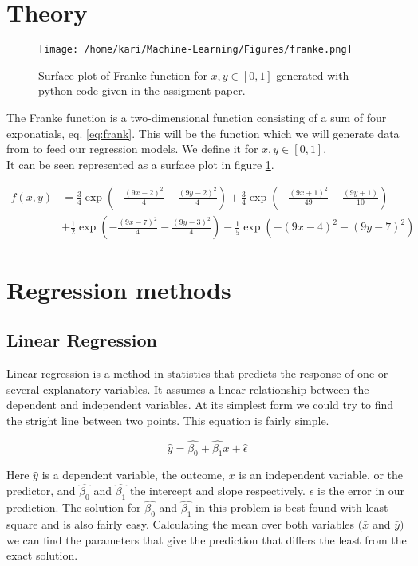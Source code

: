 \documentclass[a4paper,12pt, english]{article}
\begin{document}
\section*{Theory}

\begin{figure}
\centering
\texttt{[image: /home/kari/Machine-Learning/Figures/franke.png]}
\caption{Surface plot of Franke function for $x, y \in [0,1]$ generated with python code given in the assigment paper.}
\label{fig:franke}
\end{figure}


The Franke function is a two-dimensional function consisting of a sum of four exponatials, eq. \ref{eq:frank}. This will be the function which we will generate data from to feed our regression models. We define it for $x, y \in [0,1]$. \\
It can be seen represented as a surface plot in figure \ref{fig:franke}.

\begin{align}
f(x,y) &= \frac{3}{4}\exp{\left(-\frac{(9x-2)^2}{4} - \frac{(9y-2)^2}{4}\right)}+\frac{3}{4}\exp{\left(-\frac{(9x+1)^2}{49}- \frac{(9y+1)}{10}\right)} \nonumber \\
&+\frac{1}{2}\exp{\left(-\frac{(9x-7)^2}{4} - \frac{(9y-3)^2}{4}\right)} -\frac{1}{5}\exp{\left(-(9x-4)^2 - (9y-7)^2\right) } \label{eq:frank}
\end{align}




\section*{Regression methods}

\subsection*{Linear Regression}

Linear regression is a method in statistics that predicts the response of one or several explanatory variables. It assumes a linear relationship between the dependent and independent variables. At its simplest form we could try to find the stright line between two points. This equation is fairly simple.

\begin{equation}
\hat{y} = \hat{\beta_{0}} + \hat{\beta_{1}}x + \hat{\epsilon}
\end{equation}

Here $\hat{y}$ is a dependent variable, the outcome, $x$ is an independent variable, or the predictor, and $\hat{\beta_{0}}$ and $\hat{\beta_{1}}$ the intercept and slope respectively. $\epsilon$ is the error in our prediction. The solution for $\hat{\beta_{0}}$ and $\hat{\beta_{1}}$ in this problem is best found with least square and is also fairly easy. Calculating the mean over both variables $(\bar{x}$ and $\bar{y})$ we can find the parameters that give the prediction that differs the least from the exact solution.
\end{document}
